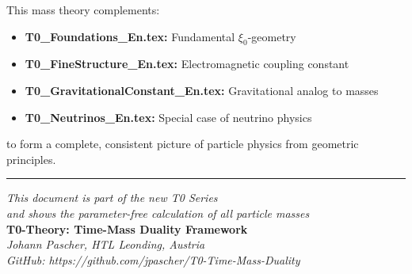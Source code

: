 \documentclass[12pt,a4paper]{article}
\begin{document}
	This mass theory complements:
	\begin{itemize}
		\item \textbf{T0\_Foundations\_En.tex:} Fundamental $\xi_0$-geometry
		\item \textbf{T0\_FineStructure\_En.tex:} Electromagnetic coupling constant
		\item \textbf{T0\_GravitationalConstant\_En.tex:} Gravitational analog to masses
		\item \textbf{T0\_Neutrinos\_En.tex:} Special case of neutrino physics
	\end{itemize}
	
	to form a complete, consistent picture of particle physics from geometric principles.
	
	\begin{center}
		\hrule
		\vspace{0.5cm}
		\textit{This document is part of the new T0 Series}\\
		\textit{and shows the parameter-free calculation of all particle masses}\\
		\vspace{0.3cm}
		\textbf{T0-Theory: Time-Mass Duality Framework}\\
		\textit{Johann Pascher, HTL Leonding, Austria}\\
								\textit{GitHub: https://github.com/jpascher/T0-Time-Mass-Duality}
		\vspace{0.3cm}
	\end{center}
	
\end{document}
